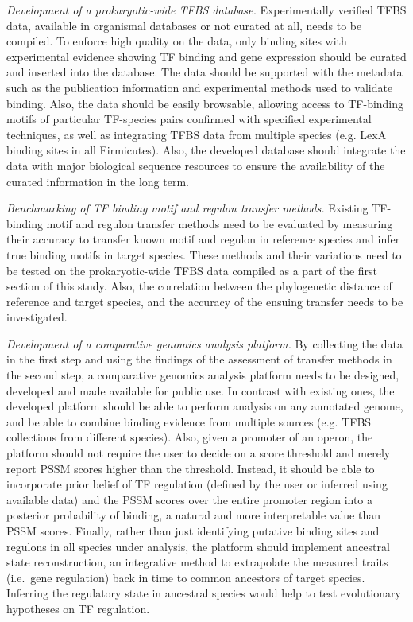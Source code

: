 \textit{Development of a prokaryotic-wide TFBS database.}
Experimentally verified TFBS data, available in organismal databases or not
curated at all, needs to be compiled. To enforce high quality on the data, only
binding sites with experimental evidence showing TF binding and gene expression
should be curated and inserted into the database. The data should be supported
with the metadata such as the publication information and experimental methods
used to validate binding. Also, the data should be easily browsable, allowing
access to TF-binding motifs of particular TF-species pairs confirmed with
specified experimental techniques, as well as integrating TFBS data from
multiple species (e.g. LexA binding sites in all Firmicutes). Also, the
developed database should integrate the data with major biological sequence
resources to ensure the availability of the curated information in the long
term.

\textit{Benchmarking of TF binding motif and regulon transfer methods.}
Existing TF-binding motif and regulon transfer methods need to be evaluated by
measuring their accuracy to transfer known motif and regulon in reference
species and infer true binding motifs in target species. These methods and
their variations need to be tested on the prokaryotic-wide TFBS data compiled
as a part of the first section of this study. Also, the correlation between the
phylogenetic distance of reference and target species, and the accuracy of the
ensuing transfer needs to be investigated.

\textit{Development of a comparative genomics analysis platform.}  By
collecting the data in the first step and using the findings of the assessment
of transfer methods in the second step, a comparative genomics analysis
platform needs to be designed, developed and made available for public
use. In contrast with existing ones, the developed platform should be able to
perform analysis on any annotated genome, and be able to combine
binding evidence from multiple sources (e.g. TFBS collections from different
species). Also, given a promoter of an operon, the platform should not require
the user to decide on a score threshold and merely report PSSM scores higher
than the threshold. Instead, it should be able to incorporate prior belief of
TF regulation (defined by the user or inferred using available data) and the
PSSM scores over the entire promoter region into a posterior probability of
binding, a natural and more interpretable value than PSSM scores. Finally,
rather than just identifying putative binding sites and regulons in all species
under analysis, the platform should implement ancestral state reconstruction,
an integrative method to extrapolate the measured traits (i.e.\ gene
regulation) back in time to common ancestors of target species. Inferring the
regulatory state in ancestral species would help to test evolutionary
hypotheses on TF regulation.


